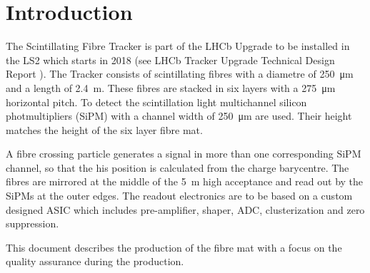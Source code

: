\section{Introduction}
\label{sec:Introduction}

The Scintillating Fibre Tracker is part of the LHCb Upgrade to be installed in the LS2 which starts in 2018 (see LHCb Tracker Upgrade Technical Design Report \cite{LHCb-TDR-015}). The Tracker consists of scintillating fibres with a diametre of \SI{250}{\micro\metre} and a length of \SI{2.4}{\metre}. These fibres are stacked in six layers with a \SI{275}{\micro\metre} horizontal pitch. To detect the scintillation light multichannel silicon photmultipliers (SiPM) with a channel width of \SI{250}{\micro\metre} are used. Their height matches the height of the six layer fibre mat.

A fibre crossing particle generates a signal in more than one corresponding SiPM channel, so that the his position is calculated from the charge barycentre. The fibres are mirrored at the middle of the \SI{5}{\m} high acceptance and read out by the SiPMs at the outer edges. The readout electronics are to be based on a custom designed ASIC which includes pre-amplifier, shaper, ADC, clusterization and zero suppression.

This document describes the production of the fibre mat with a focus on the quality assurance during the production.

